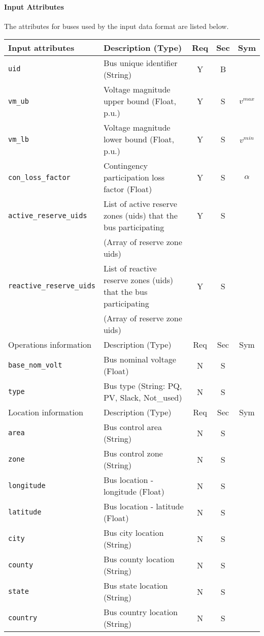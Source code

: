 \documentclass{article}
\begin{document}
\paragraph{Input Attributes} The attributes for buses used by the input data format are listed below.

\begin{center}
\small
\begin{tabular}{ l | l | c | c | c |}
Input attributes & Description (Type) & Req & Sec & Sym\\
\hline
  {\tt uid} & Bus unique identifier (String)& Y & B &  \\
  {\tt vm\_ub} & Voltage magnitude upper bound (Float, p.u.)& Y & S & $v^{max}$\\
  {\tt vm\_lb} & Voltage magnitude lower bound (Float, p.u.)& Y & S & $v^{min}$\\
  {\tt con\_loss\_factor} & Contingency participation loss factor (Float) & Y & S & $\alpha$\\
  {\tt active\_reserve\_uids} & List of active reserve zones (uids) that the bus participating & Y & S & \\ 
                     &  (Array of reserve zone uids) &  & & \\ 
  {\tt reactive\_reserve\_uids} & List of reactive reserve zones (uids) that the bus participating & Y & S & \\ 
                     &  (Array of reserve zone uids) &  & & \\                      
  \hline
  Operations information & Description (Type) & Req & Sec & Sym\\
  \hline
  {\tt base\_nom\_volt} & Bus nominal voltage (Float) & N & S & \\
  {\tt type} & Bus type (String: PQ, PV, Slack, Not\_used) & N & S &\\  
  \hline
  Location information & Description (Type) & Req & Sec & Sym\\
  \hline
  {\tt area} &  Bus control area (String)& N & S & \\
  {\tt zone} &  Bus control zone (String)& N & S & \\ 
  {\tt longitude} & Bus location - longitude (Float) & N & S & \\
  {\tt latitude} & Bus location - latitude (Float) & N & S & \\
  {\tt city}     & Bus city location (String) & N & S & \\
  {\tt county}     & Bus county location (String) & N & S & \\
  {\tt state}    & Bus state location (String) & N & S & \\
  {\tt country}  & Bus country location (String) & N & S & \\
  \hline  
\end{tabular}
\end{center}
\end{document}
